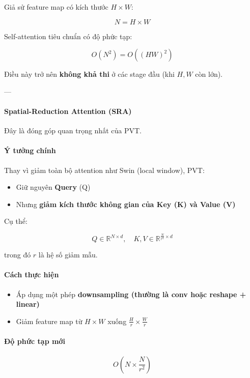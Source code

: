 Giả sử feature map có kích thước $H \times W$:

\[
N = H \times W
\]

Self-attention tiêu chuẩn có độ phức tạp:

\[
O(N^2) = O((HW)^2)
\]

Điều này trở nên \textbf{không khả thi} ở các stage đầu (khi $H, W$ còn lớn).

---

\paragraph{Spatial-Reduction Attention (SRA)}
\label{subsubsec:pvt_sra}

Đây là đóng góp quan trọng nhất của PVT.

\paragraph{Ý tưởng chính}

Thay vì giảm toàn bộ attention như Swin (local window), PVT:

\begin{itemize}
	\item Giữ nguyên \textbf{Query} (Q)
	\item Nhưng \textbf{giảm kích thước không gian của Key (K) và Value (V)}
\end{itemize}

Cụ thể:

\[
Q \in \mathbb{R}^{N \times d}, \quad
K, V \in \mathbb{R}^{\frac{N}{r^2} \times d}
\]

trong đó $r$ là hệ số giảm mẫu.

\paragraph{Cách thực hiện}

\begin{itemize}
	\item Áp dụng một phép \textbf{downsampling (thường là conv hoặc reshape + linear)}
	\item Giảm feature map từ $H \times W$ xuống $\frac{H}{r} \times \frac{W}{r}$
\end{itemize}

\paragraph{Độ phức tạp mới}

\[
O\left(N \times \frac{N}{r^2}\right)
\]

